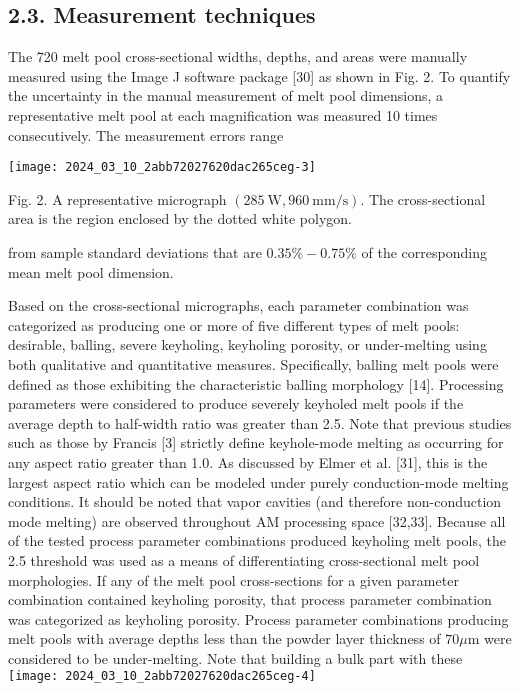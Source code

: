 \documentclass[10pt]{article}
\begin{document}
\subsection*{2.3. Measurement techniques}
The 720 melt pool cross-sectional widths, depths, and areas were manually measured using the Image J software package [30] as shown in Fig. 2. To quantify the uncertainty in the manual measurement of melt pool dimensions, a representative melt pool at each magnification was measured 10 times consecutively. The measurement errors range

\begin{center}
\texttt{[image: 2024\_03\_10\_2abb72027620dac265ceg-3]}
\end{center}

Fig. 2. A representative micrograph $(285 \mathrm{~W}, 960 \mathrm{~mm} / \mathrm{s})$. The cross-sectional area is the region enclosed by the dotted white polygon.

from sample standard deviations that are $0.35 \%-0.75 \%$ of the corresponding mean melt pool dimension.

Based on the cross-sectional micrographs, each parameter combination was categorized as producing one or more of five different types of melt pools: desirable, balling, severe keyholing, keyholing porosity, or under-melting using both qualitative and quantitative measures. Specifically, balling melt pools were defined as those exhibiting the characteristic balling morphology [14]. Processing parameters were considered to produce severely keyholed melt pools if the average depth to half-width ratio was greater than 2.5. Note that previous studies such as those by Francis [3] strictly define keyhole-mode melting as occurring for any aspect ratio greater than 1.0. As discussed by Elmer et al. [31], this is the largest aspect ratio which can be modeled under purely conduction-mode melting conditions. It should be noted that vapor cavities (and therefore non-conduction mode melting) are observed throughout AM processing space [32,33]. Because all of the tested process parameter combinations produced keyholing melt pools, the 2.5 threshold was used as a means of differentiating cross-sectional melt pool morphologies. If any of the melt pool cross-sections for a given parameter combination contained keyholing porosity, that process parameter combination was categorized as keyholing porosity. Process parameter combinations producing melt pools with average depths less than the powder layer thickness of $70 \mu \mathrm{m}$ were considered to be under-melting. Note that building a bulk part with these\\
\texttt{[image: 2024\_03\_10\_2abb72027620dac265ceg-4]}
\end{document}
